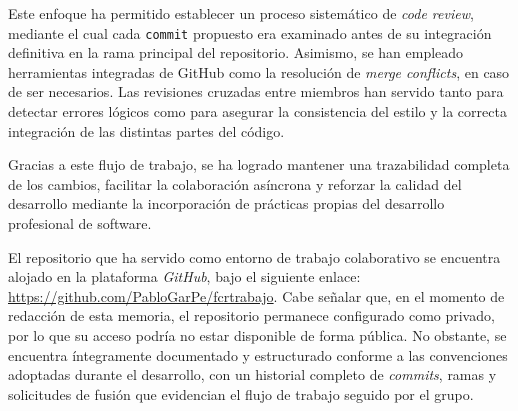 \documentclass[11pt,a4paper]{article}
\begin{document}
\noindent Este enfoque ha permitido establecer un proceso sistemático de \textit{code review}, mediante el cual cada \texttt{commit} propuesto era examinado antes de su integración definitiva en la rama principal del repositorio. Asimismo, se han empleado herramientas integradas de GitHub como la resolución de \textit{merge conflicts}, en caso de ser necesarios. Las revisiones cruzadas entre miembros han servido tanto para detectar errores lógicos como para asegurar la consistencia del estilo y la correcta integración de las distintas partes del código. \vspace{2ex}

\noindent Gracias a este flujo de trabajo, se ha logrado mantener una trazabilidad completa de los cambios, facilitar la colaboración asíncrona y reforzar la calidad del desarrollo mediante la incorporación de prácticas propias del desarrollo profesional de software.\vspace{2ex}

\noindent El repositorio que ha servido como entorno de trabajo colaborativo se encuentra alojado en la plataforma \textit{GitHub}, bajo el siguiente enlace: \href{https://github.com/PabloGarPe/fcrtrabajo}{https://github.com/PabloGarPe/fcrtrabajo}. Cabe señalar que, en el momento de redacción de esta memoria, el repositorio permanece configurado como privado, por lo que su acceso podría no estar disponible de forma pública. No obstante, se encuentra íntegramente documentado y estructurado conforme a las convenciones adoptadas durante el desarrollo, con un historial completo de \textit{commits}, ramas y solicitudes de fusión que evidencian el flujo de trabajo seguido por el grupo.
\end{document}
